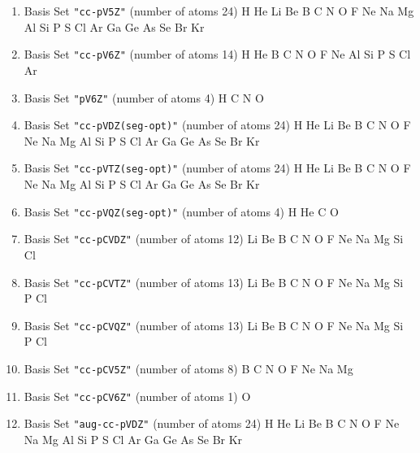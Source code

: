 \begin{enumerate}
\item Basis Set \verb#"cc-pV5Z"# (number of atoms 24)  \newline
  H He Li Be B C N O F Ne Na Mg Al Si P S Cl Ar Ga Ge As Se Br Kr


\item Basis Set \verb#"cc-pV6Z"# (number of atoms 14)  \newline
  H He B C N O F Ne Al Si P S Cl Ar


\item Basis Set \verb#"pV6Z"# (number of atoms 4)  \newline
  H C N O


\item Basis Set \verb#"cc-pVDZ(seg-opt)"# (number of atoms 24)  \newline
  H He Li Be B C N O F Ne Na Mg Al Si P S Cl Ar Ga Ge As Se Br Kr


\item Basis Set \verb#"cc-pVTZ(seg-opt)"# (number of atoms 24)  \newline
  H He Li Be B C N O F Ne Na Mg Al Si P S Cl Ar Ga Ge As Se Br Kr


\item Basis Set \verb#"cc-pVQZ(seg-opt)"# (number of atoms 4)  \newline
  H He C O

\item Basis Set \verb#"cc-pCVDZ"# (number of atoms 12)  \newline
  Li Be B C N O F Ne Na Mg Si Cl


\item Basis Set \verb#"cc-pCVTZ"# (number of atoms 13)  \newline
  Li Be B C N O F Ne Na Mg Si P Cl


\item Basis Set \verb#"cc-pCVQZ"# (number of atoms 13)  \newline
  Li Be B C N O F Ne Na Mg Si P Cl


\item Basis Set \verb#"cc-pCV5Z"# (number of atoms 8)  \newline
  B C N O F Ne Na Mg


\item Basis Set \verb#"cc-pCV6Z"# (number of atoms 1)  \newline
  O


\item Basis Set \verb#"aug-cc-pVDZ"# (number of atoms 24)  \newline
  H He Li Be B C N O F Ne Na Mg Al Si P S Cl Ar Ga Ge As Se Br Kr



\end{enumerate}
